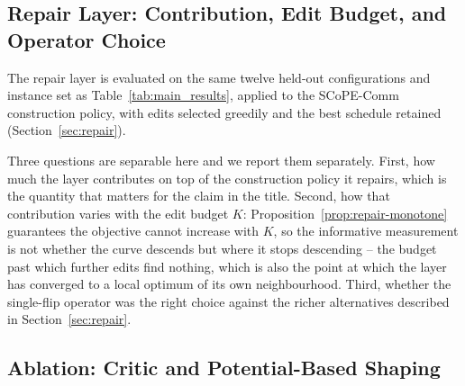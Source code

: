\subsection{Repair Layer: Contribution, Edit Budget, and Operator Choice}
\label{sec:repair-results}


The repair layer is evaluated on the same twelve held-out configurations and instance set as Table~\ref{tab:main_results}, applied to the SCoPE-Comm construction policy, with edits selected greedily and the best schedule retained (Section~\ref{sec:repair}).

Three questions are separable here and we report them separately. First, how much the layer contributes on top of the construction policy it repairs, which is the quantity that matters for the claim in the title. Second, how that contribution varies with the edit budget $K$: Proposition~\ref{prop:repair-monotone} guarantees the objective cannot increase with $K$, so the informative measurement is not whether the curve descends but where it stops descending -- the budget past which further edits find nothing, which is also the point at which the layer has converged to a local optimum of its own neighbourhood. Third, whether the single-flip operator was the right choice against the richer alternatives described in Section~\ref{sec:repair}.

\subsection{Ablation: Critic and Potential-Based Shaping}
\label{sec:ablation}


